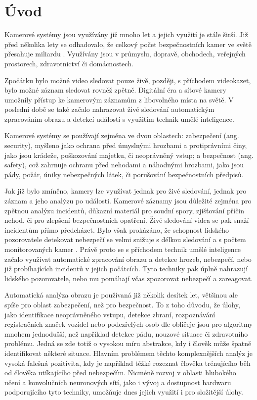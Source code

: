 \chapter{Úvod}
\label{chap:Introduction}

Kamerové systémy jsou využívány již mnoho let a jejich využití je stále širší.
Již před několika lety se odhadovalo, že celkový počet bezpečnostních kamer ve
světě přesahuje miliardu \cite{surveillance}. Využívány jsou v průmyslu,
dopravě, obchodech, veřejných prostorech, zdravotnictví či domácnostech.

Zpočátku bylo možné video sledovat pouze živě, později, s příchodem videokazet,
bylo možné záznam sledovat rovněž zpětně. Digitální éra a síťové kamery
umožnily přístup ke kamerovým záznamům z libovolného místa na světě. V poslední
době se také začalo nahrazovat živé sledování automatickým zpracováním obrazu a
detekcí událostí s využitím technik umělé inteligence.

Kamerové systémy se používají zejména ve dvou oblastech: zabezpečení (ang.
security), myšleno jako ochrana před úmyslnými hrozbami a protiprávními činy,
jako jsou krádeže, poškozování majetku, či neoprávněný vstup; a bezpečnost
(ang. safety), což zahrnuje ochranu před nehodami a náhodnými hrozbami, jako
jsou pády, požár, úniky nebezpečných látek, či porušování bezpečnostních
předpisů.

Jak již bylo zmíněno, kamery lze využívat jednak pro živé sledování, jednak pro
záznam a jeho analýzu po události. Kamerové záznamy jsou důležité zejména pro
zpětnou analýzu incidentů, důkazní materiál pro soudní spory, zjišťování příčin
nehod, či pro zlepšení bezpečnostních opatření. Živé sledování videa se pak
snaží incidentům přímo předcházet. Bylo však prokázáno, že schopnost lidského
pozorovatele detekovat nebezpečí se velmi snižuje s délkou sledování a s počtem
monitorovaných kamer \cite{soton371614}. Právě proto se s příchodem technik
umělé inteligence začalo využívat automatické zpracování obrazu a detekce
hrozeb, nebezpečí, nebo již probíhajících incidentů v jejich počátcích. Tyto
techniky pak úplně nahrazují lidského pozorovatele, nebo mu pomáhají včas
zpozorovat nebezpečí a zareagovat.

Automatická analýza obrazu je používaná již několik desítek let, většinou ale
spíše pro oblast zabezpečení, než pro bezpečnost. To z toho důvodu, že úlohy,
jako identifikace neoprávněného vstupu, detekce zbraní, rozpoznávání registračních značek vozidel nebo
podezřelých osob dle obličeje jsou pro algoritmy mnohem jednodušší, než
například detekce pádu, nouzové situace či zdravotního problému. Jedná se zde
totiž o vysokou míru abstrakce, kdy i člověk může špatně identifikovat některé
situace. Hlavním problémem těchto komplexnějších analýz je vysoká falešná
pozitivita, kdy je například těžké rozeznat člověka trénujícího běh od člověka
utíkajícího před nebezpečím. Nicméně rozvoj v oblasti hlubokého učení a
konvolučních neuronových sítí, jako i vývoj a dostupnost hardwaru podporujícího
tyto techniky, umožňuje dnes jejich využití i pro složitější úlohy.

